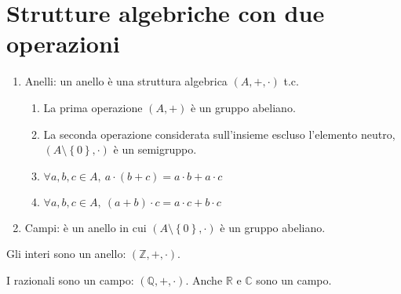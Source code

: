 \section{Strutture algebriche con due operazioni}

\begin{enumerate}
    \item Anelli: un anello \`e una struttura algebrica $(A, +, \cdot)$ t.c. 
    \begin{enumerate}
        \item La prima operazione $\left( A, + \right )$ \`e un gruppo abeliano.
        \item La seconda operazione considerata sull'insieme escluso l'elemento neutro, $(A \setminus \left \{ 0 \right \}, \cdot )$ \`e un semigruppo.
        \item $ \forall a, b, c \in A , \ a \cdot (b + c) = a \cdot b + a \cdot c $
        \item $ \forall a, b, c \in A , \ (a + b) \cdot c = a \cdot c + b \cdot c $
    \end{enumerate}
    \item Campi: \`e un anello in cui $( A \setminus \left \{ 0 \right \}, \cdot )$ \`e un gruppo abeliano.
\end{enumerate}

Gli interi sono un anello: $\left ( \mathbb{Z}, +, \cdot \right )$.

I razionali sono un campo: $\left ( \mathbb{Q}, +, \cdot \right )$. Anche $\mathbb{R}$ e $\mathbb{C}$ sono un campo.
